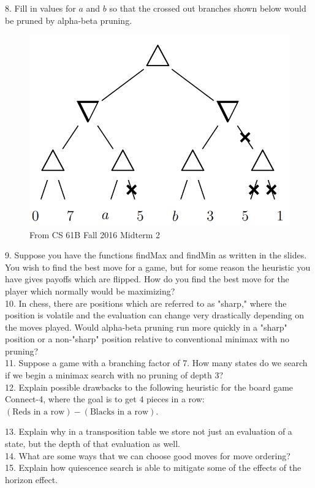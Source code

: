 \documentclass[12pt, letterpaper]{article}
\begin{document}
8. Fill in values for $a$ and $b$ so that the crossed out branches shown below would be pruned by alpha-beta pruning.
\begin{figure}[H]
    \centering
    \includegraphics[scale=0.3]{alpha-beta-prob.png}
    \caption*{From CS 61B Fall 2016 Midterm 2}
\end{figure}


9. Suppose you have the functions findMax and findMin as written in the slides. You wish to find the best move for a game, but for some reason the heuristic you have gives payoffs which are flipped. How do you find the best move for the player which normally would be maximizing? \\

10. In chess, there are positions which are referred to as "sharp," where the position is volatile and the evaluation can change very drastically depending on the moves played. Would alpha-beta pruning run more quickly in a "sharp" position or a non-"sharp" position relative to conventional minimax with no pruning? \\

11. Suppose a game with a branching factor of 7. How many states do we search if we begin a minimax search with no pruning of depth 3? \\

12. Explain possible drawbacks to the following heuristic for the board game Connect-4, where the goal is to get $4$ pieces in a row: $(\text{Reds in a row}) - (\text{Blacks in a row})$.

13. Explain why in a transposition table we store not just an evaluation of a state, but the depth of that evaluation as well. \\

14. What are some ways that we can choose good moves for move ordering? \\

15. Explain how quiescence search is able to mitigate some of the effects of the horizon effect.\\
\end{document}
